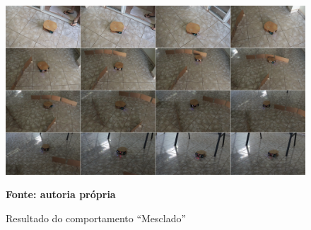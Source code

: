 \begin{figure}[!ht]
\centering
\caption{Resultado do comportamento ``Mesclado''}
\label{fig:resultadoImplementadoMesclado}
		\centering
		\includegraphics[clip, 
scale=0.29]{Figuras/ComportamentoIPO_E_EOCompactado}%

	\textbf{Fonte: autoria própria}
\end{figure}